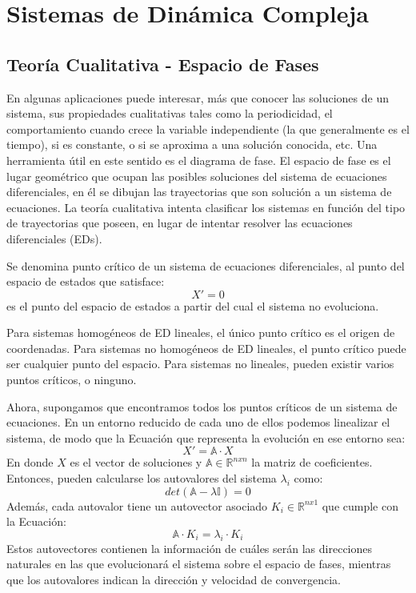 \chapter{Sistemas de Dinámica Compleja}
\label{capSist}



\section{Teoría Cualitativa - Espacio de Fases}
En algunas aplicaciones puede interesar, más que conocer las soluciones de un sistema, sus propiedades cualitativas tales como la periodicidad, el comportamiento cuando crece la variable independiente (la que generalmente es el tiempo), si es constante, o si se aproxima a una solución conocida, etc.
Una herramienta útil en este sentido es el diagrama de fase.
El espacio de fase es el lugar geométrico que ocupan las posibles soluciones del sistema de ecuaciones diferenciales, en él se dibujan las trayectorias que son solución a un sistema de ecuaciones.
La teoría cualitativa intenta clasificar los sistemas en función del tipo de trayectorias que poseen, en lugar de intentar resolver las ecuaciones diferenciales (EDs).

Se denomina punto crítico de un sistema de ecuaciones diferenciales, al punto del espacio de estados que satisface:
\begin{equation}
X'=0
\end{equation}
es el punto del espacio de estados a partir del cual el sistema no evoluciona.

Para sistemas homogéneos de ED lineales, el único punto crítico es el origen de coordenadas. Para sistemas no homogéneos de ED lineales, el punto crítico puede ser cualquier punto del espacio. Para sistemas no lineales, pueden existir varios puntos críticos, o ninguno.

Ahora, supongamos que encontramos todos los puntos críticos de un sistema de ecuaciones.
En un entorno reducido de cada uno de ellos podemos linealizar el sistema, de modo que la Ecuación que representa la evolución en ese entorno sea:
\begin{equation}
X' = \mathbb{A} \cdot X
\end{equation}
En donde $X$ es el vector de soluciones y $\mathbb{A} \in \mathbb{R}^{nxn}$ la matriz de coeficientes.
Entonces, pueden calcularse los autovalores del sistema $\lambda_i$ como:
\begin{equation}
det(\mathbb{A}-\lambda \mathbb{I}) = 0
\end{equation}
Además, cada autovalor tiene un autovector asociado $K_i \in \mathbb{R}^{nx1}$ que cumple con la Ecuación:
\begin{equation}
	\mathbb{A} \cdot K_i = \lambda_i \cdot K_i
\end{equation}
Estos autovectores contienen la información de cuáles serán las direcciones naturales en las que evolucionará el sistema sobre el espacio de fases, mientras que los autovalores indican la dirección y velocidad de convergencia.

